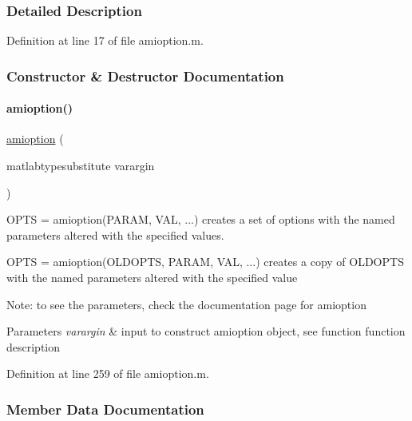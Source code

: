 \subsubsection{Detailed Description}


Definition at line 17 of file amioption.\+m.



\subsubsection{Constructor \& Destructor Documentation}
\mbox{\label{classamioption_a86c655c4010c1c2ddb3e68693a07ef37}} 
\paragraph{\texorpdfstring{amioption()}{amioption()}}
{\footnotesize\ttfamily \mbox{\hyperlink{classamioption}{amioption}} (\begin{DoxyParamCaption}\item[{matlabtypesubstitute}]{varargin }\end{DoxyParamCaption})}

O\+P\+TS = amioption(P\+A\+R\+AM, V\+AL, ...) creates a set of options with the named parameters altered with the specified values.

O\+P\+TS = amioption(O\+L\+D\+O\+P\+TS, P\+A\+R\+AM, V\+AL, ...) creates a copy of O\+L\+D\+O\+P\+TS with the named parameters altered with the specified value

Note\+: to see the parameters, check the documentation page for amioption


\begin{DoxyParams}{Parameters}
{\em varargin} & input to construct amioption object, see function function description \\
\hline
\end{DoxyParams}


Definition at line 259 of file amioption.\+m.



\subsubsection{Member Data Documentation}
\mbox{\label{classamioption_a0c5f3dcf809a17b895fe12fc91272349}} 
